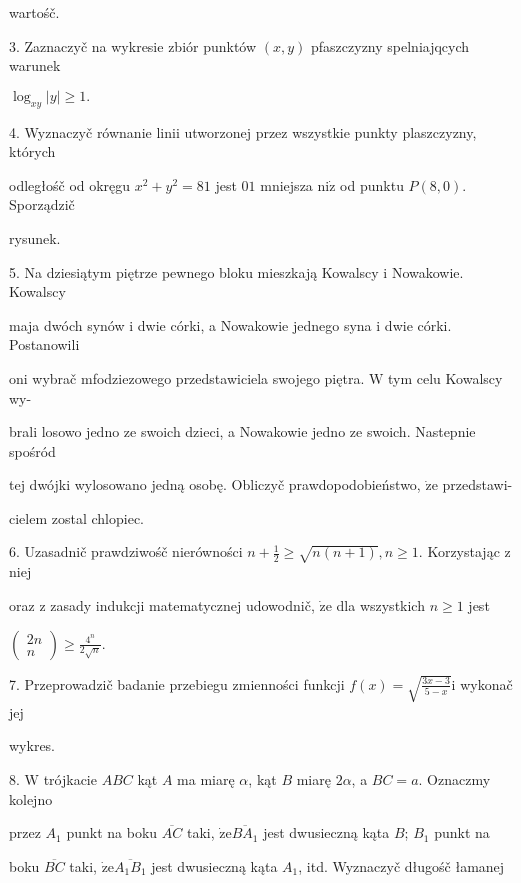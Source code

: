 \documentclass[a4paper,12pt]{article}
\begin{document}
wartośč.

3. Zaznaczyč na wykresie zbiór punktów $(x,y)$ pfaszczyzny spelniajqcych warunek

$\log_{xy}|y|\geq 1.$

4. Wyznaczyč równanie linii utworzonej przez wszystkie punkty plaszczyzny, których

odległośč od okręgu $x^{2}+y^{2}=81$ jest $01$ mniejsza $\mathrm{n}\mathrm{i}\dot{\mathrm{z}}$ od punktu $P(8,0)$. Sporządzič

rysunek.

5. Na dziesiątym piętrze pewnego bloku mieszkają Kowalscy $\mathrm{i}$ Nowakowie. Kowalscy

maja dwóch synów $\mathrm{i}$ dwie córki, a Nowakowie jednego syna $\mathrm{i}$ dwie córki. Postanowili

oni wybrač mfodziezowego przedstawiciela swojego piętra. $\mathrm{W}$ tym celu Kowalscy wy-

brali losowo jedno ze swoich dzieci, a Nowakowie jedno ze swoich. Nastepnie spośród

tej dwójki wylosowano jedną osobę. Obliczyč prawdopodobieństwo, $\dot{\mathrm{z}}\mathrm{e}$ przedstawi-

cielem zostal chlopiec.

6. Uzasadnič prawdziwośč nierówności $n+\displaystyle \frac{1}{2}\geq\sqrt{n(n+1)}, n\geq 1$. Korzystając $\mathrm{z}$ niej

oraz $\mathrm{z}$ zasady indukcji matematycznej udowodnič, $\dot{\mathrm{z}}\mathrm{e}$ dla wszystkich $n\geq 1$ jest

$\displaystyle \left(\begin{array}{l}
2n\\
n
\end{array}\right)\geq\frac{4^{n}}{2\sqrt{n}}.$

7. Przeprowadzič badanie przebiegu zmienności funkcji $f(x) = \sqrt{\frac{3x-3}{5-x}}\mathrm{i}$ wykonač jej

wykres.

8. $\mathrm{W}$ trójkacie $ABC$ kąt $A$ ma miarę $\alpha$, kąt $B$ miarę $ 2\alpha$, a $BC=a$. Oznaczmy kolejno

przez $A_{1}$ punkt na boku $\overline{AC}$ taki, $\dot{\mathrm{z}}\mathrm{e}\overline{BA_{1}}$ jest dwusieczną kąta $B$; $B_{1}$ punkt na

boku $\overline{BC}$ taki, $\dot{\mathrm{z}}\mathrm{e}\overline{A_{1}B_{1}}$ jest dwusieczną kąta $A_{1}$, itd. Wyznaczyč długośč łamanej
\end{document}
